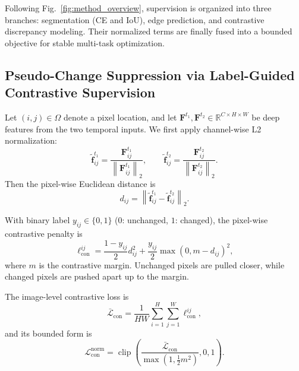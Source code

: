 Following Fig.~\ref{fig:method_overview}, supervision is organized into three branches: segmentation (CE and IoU), edge prediction, and contrastive discrepancy modeling. Their normalized terms are finally fused into a bounded objective for stable multi-task optimization.

\subsection{Pseudo-Change Suppression via Label-Guided Contrastive Supervision}\label{sec:Methodology:PseudoChangeSuppression}
Let $(i,j)\in\Omega$ denote a pixel location, and let $\mathbf{F}^{t_1},\mathbf{F}^{t_2}\in\mathbb{R}^{C\times H\times W}$ be deep features from the two temporal inputs. We first apply channel-wise L2 normalization:
\begin{equation}
    \tilde{\mathbf{f}}^{t_1}_{ij}=
    \frac{\mathbf{F}^{t_1}_{ij}}{\left\|\mathbf{F}^{t_1}_{ij}\right\|_2},
    \qquad
    \tilde{\mathbf{f}}^{t_2}_{ij}=
    \frac{\mathbf{F}^{t_2}_{ij}}{\left\|\mathbf{F}^{t_2}_{ij}\right\|_2}.
    \label{eq:feature_normalization}
\end{equation}
Then the pixel-wise Euclidean distance is
\begin{equation}
    d_{ij}=\left\|\tilde{\mathbf{f}}^{t_1}_{ij}-\tilde{\mathbf{f}}^{t_2}_{ij}\right\|_2.
    \label{eq:feature_distance}
\end{equation}

With binary label $y_{ij}\in\{0,1\}$ ($0$: unchanged, $1$: changed), the pixel-wise contrastive penalty is
\begin{equation}
    \ell_{\text{con}}^{ij}
    =
    \frac{1-y_{ij}}{2}d_{ij}^{2}
    +
    \frac{y_{ij}}{2}\max(0,m-d_{ij})^{2},
    \label{eq:pixel_contrastive}
\end{equation}
where $m$ is the contrastive margin. Unchanged pixels are pulled closer, while changed pixels are pushed apart up to the margin.

The image-level contrastive loss is
\begin{equation}
    \bar{\mathcal{L}}_{\text{con}}
    =
    \frac{1}{HW}\sum_{i=1}^{H}\sum_{j=1}^{W}\ell_{\text{con}}^{ij},
    \label{eq:image_contrastive}
\end{equation}
and its bounded form is
\begin{equation}
    \mathcal{L}_{\text{con}}^{\text{norm}}
    =
    \operatorname{clip}
    \left(
        \frac{\bar{\mathcal{L}}_{\text{con}}}{\max\left(1,\frac{1}{2}m^2\right)},
        0,1
    \right).
    \label{eq:contrastive_normalization}
\end{equation}

